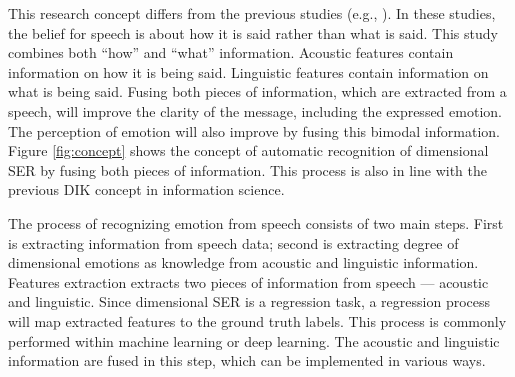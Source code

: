 This research concept differs from the previous studies (e.g., \cite{Li2019b,
Vayrynen2014}). In these studies, the belief for speech is about how it is said
rather than what is said. This study combines both ``how'' and ``what''
information. Acoustic features contain information on how it is being said.
Linguistic features contain information on what is being said. Fusing both
pieces of information, which are extracted from a speech, will improve the
clarity of the message, including the expressed emotion. The perception of
emotion will also improve by fusing this bimodal information. Figure
\ref{fig:concept} shows the concept of automatic recognition of dimensional SER
by fusing both pieces of information. This process is also in line with the
previous DIK concept in information science.

The process of recognizing emotion from speech consists of two main steps.
First is extracting information from speech data; second is extracting degree
of dimensional emotions as knowledge from acoustic and linguistic information.
Features extraction extracts two pieces of information from speech --- acoustic
and linguistic. Since dimensional SER is a regression task, a regression
process will map extracted features to the ground truth labels. This process is
commonly performed within machine learning or deep learning. The acoustic and
linguistic information are fused in this step, which can be implemented in
various ways.

